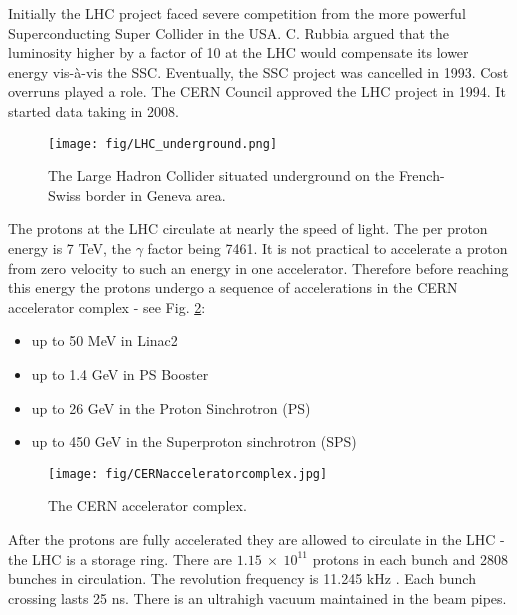 Initially the LHC project faced severe competition from the more powerful Superconducting Super Collider in the USA. C. Rubbia argued that the luminosity higher by a factor of 10 at the LHC would compensate its lower energy vis-à-vis the SSC. Eventually, the SSC project was cancelled in 1993. Cost overruns played a role. The CERN Council approved the LHC project in 1994. It started data taking in 2008.

\begin{figure}[htpb]
  \centering
  \texttt{[image: fig/LHC\_underground.png]}
  \caption{The Large Hadron Collider situated underground on the French-Swiss border in Geneva area.}
  \label{fig:LHC_underground}
\end{figure}


The protons at the LHC circulate at nearly the speed of light. The per proton energy is 7 TeV, the $\gamma$ factor being 7461. It is not practical to accelerate a proton from zero velocity to such an energy in one accelerator. Therefore before reaching this energy the protons undergo a sequence of accelerations in the CERN accelerator complex - see Fig. \ref{fig:CERN_accelerator_complex}:

\begin{itemize}
\item up to 50 MeV in Linac2
\item up to 1.4 GeV in PS Booster
\item up to 26 GeV in the Proton Sinchrotron (PS)
\item up to 450 GeV in the Superproton sinchrotron (SPS)
\end{itemize}

\begin{figure}[htpb]
  \centering
  \texttt{[image: fig/CERNacceleratorcomplex.jpg]}
  \caption{The CERN accelerator complex.}
  \label{fig:CERN_accelerator_complex}
\end{figure}

After the protons are fully accelerated they are allowed to circulate in the LHC - the LHC is a storage ring. There are $1.15\ \times\ 10^{11}$ protons in each bunch and 2808 bunches in circulation. The revolution frequency is 11.245 kHz \cite{Bruning:2004ej}. Each bunch crossing lasts 25 ns. There is an ultrahigh vacuum maintained in the beam pipes.


